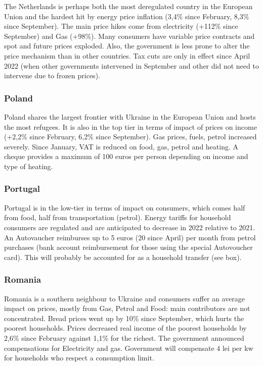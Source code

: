 \documentclass[
  9pt,
  a4paper,
  DIV=11,
  numbers=noendperiod]{scrartcl}
\begin{document}
The Netherlands is perhaps both the most deregulated country in the
European Union and the hardest hit by energy price inflation (3,4\%
since February, 8,3\% since September). The main price hikes come from
electricity (+112\% since September) and Gas (+98\%). Many consumers
have variable price contracts and spot and future prices exploded. Also,
the government is less prone to alter the price mechanism than in other
countries. Tax cuts are only in effect since April 2022 (when other
governments intervened in September and other did not need to intervene
due to frozen prices).

\hypertarget{poland}{%
\subsubsection{Poland}\label{poland}}

Poland shares the largest frontier with Ukraine in the European Union
and hosts the most refugees. It is also in the top tier in terms of
impact of prices on income (+2,2\% since February, 6,2\% since
September). Gas prices, fuels, petrol increased severely. Since January,
VAT is reduced on food, gas, petrol and heating. A cheque provides a
maximum of 100 euros per person depending on income and type of heating.

\hypertarget{portugal}{%
\subsubsection{Portugal}\label{portugal}}

Portugal is in the low-tier in terms of impact on consumers, which comes
half from food, half from transportation (petrol). Energy tariffs for
household consumers are regulated and are anticipated to decrease in
2022 relative to 2021. An Autovaucher reimburses up to 5 euros (20 since
April) per month from petrol purchases (bank account reimbursement for
those using the special Autovoucher card). This will probably be
accounted for as a household transfer (see box).

\hypertarget{romania}{%
\subsubsection{Romania}\label{romania}}

Romania is a southern neighbour to Ukraine and consumers suffer an
average impact on prices, mostly from Gas, Petrol and Food: main
contributors are not concentrated. Bread prices went up by 10\% since
September, which hurts the poorest households. Prices decreased real
income of the poorest households by 2,6\% since February against 1,1\%
for the richest. The government announced compensations for Electricity
and gas. Government will compensate 4 lei per kw for households who
respect a consumption limit.
\end{document}
